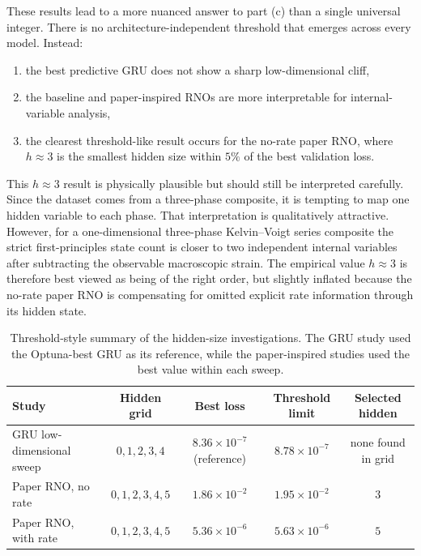 \documentclass[11pt,a4paper]{article}
\begin{document}
These results lead to a more nuanced answer to part (c) than a single universal integer. There is no architecture-independent threshold that emerges across every model. Instead:
\begin{enumerate}[leftmargin=1.5em]
    \item the best predictive GRU does not show a sharp low-dimensional cliff,
    \item the baseline and paper-inspired RNOs are more interpretable for internal-variable analysis,
    \item the clearest threshold-like result occurs for the no-rate paper RNO, where $h\approx 3$ is the smallest hidden size within $5\%$ of the best validation loss.
\end{enumerate}

This $h\approx 3$ result is physically plausible but should still be interpreted carefully. Since the dataset comes from a three-phase composite, it is tempting to map one hidden variable to each phase. That interpretation is qualitatively attractive. However, for a one-dimensional three-phase Kelvin--Voigt series composite the strict first-principles state count is closer to two independent internal variables after subtracting the observable macroscopic strain. The empirical value $h\approx 3$ is therefore best viewed as being of the right order, but slightly inflated because the no-rate paper RNO is compensating for omitted explicit rate information through its hidden state.

\begin{table}[t]
\centering
\caption{Threshold-style summary of the hidden-size investigations. The GRU study used the Optuna-best GRU as its reference, while the paper-inspired studies used the best value within each sweep.}
\label{tab:threshold_summary}
\begin{tabular}{lcccc}
\toprule
Study & Hidden grid & Best loss & Threshold limit & Selected hidden \\
\midrule
GRU low-dimensional sweep & $0,1,2,3,4$ & $8.36\times 10^{-7}$ (reference) & $8.78\times 10^{-7}$ & none found in grid \\
Paper RNO, no rate & $0,1,2,3,4,5$ & $1.86\times 10^{-2}$ & $1.95\times 10^{-2}$ & $3$ \\
Paper RNO, with rate & $0,1,2,3,4,5$ & $5.36\times 10^{-6}$ & $5.63\times 10^{-6}$ & $5$ \\
\bottomrule
\end{tabular}
\end{table}
\end{document}
